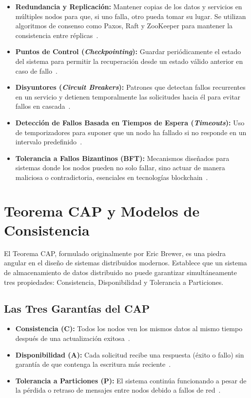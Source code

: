 \documentclass[12pt,a4paper]{article}
\begin{document}
\begin{itemize}
	\item \textbf{Redundancia y Replicación:} Mantener copias de los datos y servicios en múltiples nodos para que, si uno falla, otro pueda tomar su lugar. Se utilizan algoritmos de consenso como Paxos, Raft y ZooKeeper para mantener la consistencia entre réplicas~\cite{r17}.

	\item \textbf{Puntos de Control (\textit{Checkpointing}):} Guardar periódicamente el estado del sistema para permitir la recuperación desde un estado válido anterior en caso de fallo~\cite{r18}.

	\item \textbf{Disyuntores (\textit{Circuit Breakers}):} Patrones que detectan fallos recurrentes en un servicio y detienen temporalmente las solicitudes hacia él para evitar fallos en cascada~\cite{r09}.

	\item \textbf{Detección de Fallos Basada en Tiempos de Espera (\textit{Timeouts}):} Uso de temporizadores para suponer que un nodo ha fallado si no responde en un intervalo predefinido~\cite{r19}.

	\item \textbf{Tolerancia a Fallos Bizantinos (BFT):} Mecanismos diseñados para sistemas donde los nodos pueden no solo fallar, sino actuar de manera maliciosa o contradictoria, esenciales en tecnologías blockchain~\cite{r20}.
\end{itemize}

\section{Teorema CAP y Modelos de Consistencia}

El Teorema CAP, formulado originalmente por Eric Brewer, es una piedra angular en el diseño de sistemas distribuidos modernos. Establece que un sistema de almacenamiento de datos distribuido no puede garantizar simultáneamente tres propiedades: Consistencia, Disponibilidad y Tolerancia a Particiones.

\subsection{Las Tres Garantías del CAP}

\begin{itemize}
	\item \textbf{Consistencia (C):} Todos los nodos ven los mismos datos al mismo tiempo después de una actualización exitosa~\cite{r21}.

	\item \textbf{Disponibilidad (A):} Cada solicitud recibe una respuesta (éxito o fallo) sin garantía de que contenga la escritura más reciente~\cite{r22}.

	\item \textbf{Tolerancia a Particiones (P):} El sistema continúa funcionando a pesar de la pérdida o retraso de mensajes entre nodos debido a fallos de red~\cite{r23}.
\end{itemize}
\end{document}
